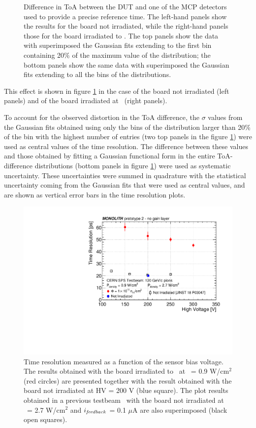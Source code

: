 \begin{figure}[h]
			\caption{Difference in ToA between the DUT and one of the MCP detectors used to provide a precise reference time. The left-hand panels show the results for the board not irradiated, while the right-hand panels those for the board irradiated to \maxflu. The top panels show the data with superimposed the Gaussian fits extending to the first bin containing 20\% of the maximum value of the distribution; the bottom panels show the same data with superimposed the Gaussian fits extending to all the bins of the distributions.}
			\label{im:MONO-IR_toa}
		\end{figure}
		This effect is shown in figure \ref{im:MONO-IR_toa} in the case of the board not irradiated (left panels) and of the board irradiated at \maxflu~(right panels). 

		To account for the observed distortion in the ToA difference, the $\sigma$ values from the Gaussian fits obtained using only the bins of the distribution larger than 20\% of the bin with the highest number of entries (two top panels in the figure \ref{im:MONO-IR_toa}) were used as central values of the time resolution.
		The difference between these values and those obtained by fitting a Gaussian functional form in the entire ToA-difference distributions (bottom panels in figure \ref{im:MONO-IR_toa}) were used as systematic uncertainty. These uncertainties were summed in quadrature with the statistical uncertainty coming from the Gaussian fits that were used as central values, and are shown as vertical error bars in the time resolution plots.

		\begin{figure}[h]
			\centering
			\includegraphics[width=.75\textwidth]{files/MONOLITH_Irradiated_paper/Voltage_timeresolution.pdf}
			\caption{Time resolution measured as a function of the sensor bias voltage. The results obtained with the board irradiated to \maxflu~at \power~= 0.9 W/cm$^2$ (red circles) are presented together with the result obtained with the board not irradiated at HV = 200 V (blue square). The plot results obtained in a previous testbeam~\cite{Monolith_20ps} with the board not irradiated at \power~= 2.7 W/cm$^2$ and  $i_{\it feedback}$ = 0.1 $\mu$A are also superimposed (black open squares).}
			\label{im:MONO-IR_HV_vs_timeres} 
		\end{figure}

